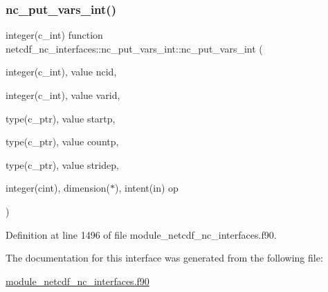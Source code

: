 \subsubsection{\texorpdfstring{nc\+\_\+put\+\_\+vars\+\_\+int()}{nc\_put\_vars\_int()}}
{\footnotesize\ttfamily integer(c\+\_\+int) function netcdf\+\_\+nc\+\_\+interfaces\+::nc\+\_\+put\+\_\+vars\+\_\+int\+::nc\+\_\+put\+\_\+vars\+\_\+int (\begin{DoxyParamCaption}\item[{integer(c\+\_\+int), value}]{ncid,  }\item[{integer(c\+\_\+int), value}]{varid,  }\item[{type(c\+\_\+ptr), value}]{startp,  }\item[{type(c\+\_\+ptr), value}]{countp,  }\item[{type(c\+\_\+ptr), value}]{stridep,  }\item[{integer(cint), dimension($\ast$), intent(in)}]{op }\end{DoxyParamCaption})}



Definition at line 1496 of file module\+\_\+netcdf\+\_\+nc\+\_\+interfaces.\+f90.



The documentation for this interface was generated from the following file\+:\begin{DoxyCompactItemize}
\item 
\hyperlink{module__netcdf__nc__interfaces_8f90}{module\+\_\+netcdf\+\_\+nc\+\_\+interfaces.\+f90}\end{DoxyCompactItemize}
